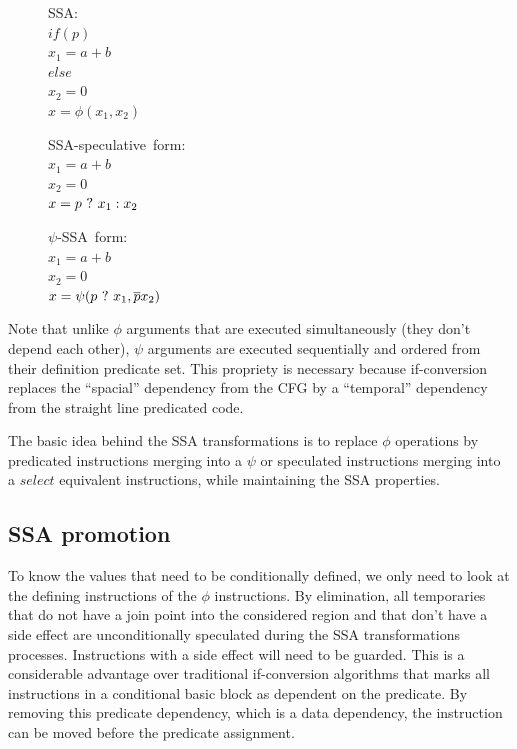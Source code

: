 \begin{figure}
\begin{minipage}[t]{4cm}
\mbox{SSA:} \\
$ if (p) $ \\
$   x_1 = a+b $ \\
$ else $ \\
$   x_2 = 0 $ \\
$ x = \phi (x_1, x_2) $ \\
\end{minipage}
\begin{minipage}[t]{4cm}
\mbox{SSA-speculative form:} \\
$x_1 = a + b $ \\
$x_2 = 0 $ \\
$x = p ~?~  x_1 : x_2$ \\
\end{minipage}
\begin{minipage}[t]{4cm}
\mbox{$\psi$-SSA form:} \\
$x_1 = a + b $ \\
$x_2 = 0 $\\
$x = \psi (p ~?~ x_1, \overline{p} x_2) $ \\
\end{minipage}
\end{figure}

Note that unlike $\phi$ arguments that are executed simultaneously (they don't depend each other), $\psi$ arguments are executed sequentially and ordered from their definition predicate set. This propriety is necessary because if-conversion replaces the ``spacial'' dependency from the CFG by a ``temporal'' dependency from the straight line predicated code.

The basic idea behind the SSA transformations is to replace $\phi$ operations by predicated instructions merging into a $\psi$ or speculated instructions merging into a $select$ equivalent instructions, while maintaining the SSA properties.

\subsection{SSA promotion}

To know the values that need to be conditionally defined, we only need to look at the defining instructions of the $\phi$ instructions. By elimination, all temporaries that do not have a join point into the considered region and that don't have a side effect are unconditionally speculated during the SSA transformations processes. Instructions with a side effect will need to be guarded. This is a considerable advantage over traditional if-conversion algorithms that marks all instructions in a conditional basic block as dependent on the predicate. By removing this predicate dependency, which is a data dependency, the instruction can be moved before the predicate assignment.

